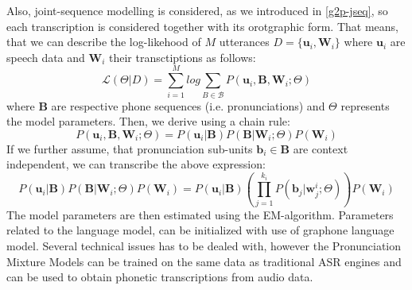 Also, joint-sequence modelling is considered, as we introduced in \ref{g2p-jseq}, so each transcription is considered together with its orotgraphic form.
That means, that we can describe the log-likehood of $M$ utterances $ D = \{\mathbf{u}_i,\mathbf{W}_i\}$ where $\mathbf{u}_i$ are speech data and $\mathbf{W}_i$ their transctiptions as follows:
\begin{equation}
\mathcal{L}(\Theta\vert D) = \sum_{i=1}^M log \sum_{B \in \mathcal{B}} P(\mathbf{u}_i,\mathbf{B},\mathbf{W}_i;\Theta)
\end{equation}
where $\mathbf{B}$ are respective phone sequences (i.e. pronunciations) and $\Theta$ represents the model parameters.
Then, we derive using a chain rule:
\begin{equation}
P(\mathbf{u}_i,\mathbf{B},\mathbf{W}_i;\Theta) =  P(\mathbf{u}_i\vert\mathbf{B})P(\mathbf{B}\vert\mathbf{W}_i;\Theta)P(\mathbf{W}_i)
\end{equation}
If we further assume, that pronunciation sub-units $\mathbf{b}_i \in \mathbf{B}$ are context independent, we can transcribe the above expression:
\begin{equation}
P(\mathbf{u}_i\vert\mathbf{B})P(\mathbf{B}\vert\mathbf{W}_i;\Theta)P(\mathbf{W}_i) = P(\mathbf{u}_i\vert\mathbf{B})(\prod_{j=1}^{k_i}P(\mathbf{b}_j\vert \mathbf{w}^i_j;\Theta))P(\mathbf{W}_i) 
\end{equation}
The model parameters are then estimated using the EM-algorithm.
Parameters related to the language model, can be initialized with use of graphone language model.
Several technical issues has to be dealed with, however the Pronunciation Mixture Models can be trained on the same data as traditional ASR engines and can be used to obtain phonetic transcriptions from audio data.
\linebreak\linebreak

